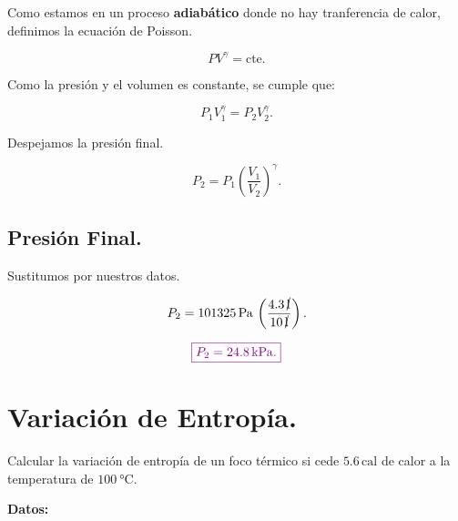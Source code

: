 \documentclass[a4paper,12pt]{article} %
\begin{document}
\begin{justify}
    Como estamos en un proceso \textbf{adiabático} donde no hay tranferencia de calor, definimos la ecuación de Poisson.
\end{justify}

\[ PV^{\gamma} = \mathrm{cte}. \]

\begin{justify}
    Como la presión y el volumen es constante, se cumple que:
\end{justify}

\[ P_1 V_1^{\gamma} = P_2 V_2^{\gamma}. \]

\begin{justify}
    Despejamos la presión final.
\end{justify}

\[ P_2 = P_1 \left( \frac{V_1}{V_2} \right)^{\gamma}. \]

\vspace{\baselineskip}

\subsection{Presión Final.}

\begin{justify}
    Sustitumos por nuestros datos.
\end{justify}

\[ P_2 = 101325 \, \mathrm{Pa} \, \left( \frac{4.3 \, \cancel{\mathrm{l}}}{10 \, \cancel{\mathrm{l}}} \right).  \]

\vspace{\baselineskip}

\[ \textcolor{violet}{\boxed{ P_2 = 24.8 \, \mathrm{kPa}. }} \]

\vspace{\baselineskip}

\section{Variación de Entropía.}

\begin{justify}
    Calcular la variación de entropía de un foco térmico si cede \( 5.6 \, \mathrm{cal} \) de calor a la temperatura de \( \SI{100}{\degreeCelsius} \).
\end{justify}

\vspace{\baselineskip}

\begin{justify}
    \textbf{Datos:}
\end{justify}
\end{document}
